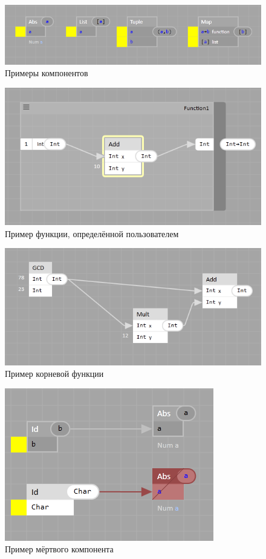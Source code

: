 \begin{figure}[h]
	\centering
	\includegraphics{img/components.PNG}
	\caption{Примеры компонентов}\label{components}	
\end{figure}
\begin{figure}[h]
	\centering
	\includegraphics{img/custom_function.PNG}
	\caption{Пример функции, определённой пользователем}\label{customfun}	
\end{figure}
\begin{figure}[h]
\centering
\includegraphics{img/core.PNG}
\caption{Пример корневой функции}\label{corefun}	
\end{figure}
\begin{figure}[h]
	\centering
	\includegraphics{img/dead.PNG}
	\caption{Пример мёртвого компонента}\label{dead}
\end{figure}

